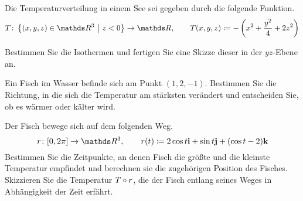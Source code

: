 \begin{atiTask}[
  title = Wie ein Fisch im Wasser
]
  Die Temperaturverteilung in einem See sei gegeben durch die folgende Funktion.
  \[
    \function{T}{\set{(x,y,z)\in\setReal^3}{z<0}}{\setReal}
    \separate
    T(x,y,z)\define -\roundBrackets{x^2 + \frac{y^2}{4} + 2z^2}
  \]
  \begin{atiSubtasks}
    \item{
      Bestimmen Sie die Isothermen und fertigen Sie eine Skizze dieser in der $yz$-Ebene an.
    }
    \item{
      Ein Fisch im Wasser befinde sich am Punkt $(1,2,-1)$.
      Bestimmen Sie die Richtung, in die sich die Temperatur am stärksten verändert und entscheiden Sie, ob es wärmer oder kälter wird.
    }
    \item{
      Der Fisch bewege sich auf dem folgenden Weg.
      \[
        \function{r}{[0,2\pi]}{\setReal^3}
        \separate
        r(t)\define 2\cos t \vectorX + \sin t \vectorY + (\cos t - 2)\vectorZ
      \]
      Bestimmen Sie die Zeitpunkte, an denen Fisch die größte und die kleinste Temperatur empfindet und berechnen sie die zugehörigen Position des Fisches.
      Skizzieren Sie die Temperatur $T\circ r$, die der Fisch entlang seines Weges in Abhängigkeit der Zeit erfährt.
    }
  \end{atiSubtasks}
\end{atiTask}